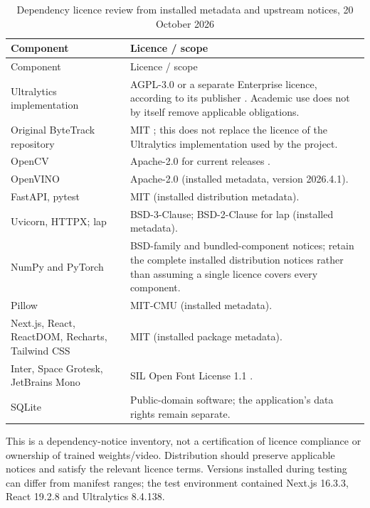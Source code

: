 \begin{longtable}{P{0.32\textwidth}P{0.55\textwidth}}
\caption{Dependency licence review from installed metadata and upstream notices, 20 October 2026}\\
\toprule
Component & Licence / scope\\
\midrule
\endfirsthead
\toprule
Component & Licence / scope\\
\midrule
\endhead
Ultralytics implementation & AGPL-3.0 or a separate Enterprise licence, according to its publisher \cite{ultralyticsLicense}. Academic use does not by itself remove applicable obligations.\\
Original ByteTrack repository & MIT \cite{bytetrackLicense}; this does not replace the licence of the Ultralytics implementation used by the project.\\
OpenCV & Apache-2.0 for current releases \cite{opencvLicense}.\\
OpenVINO & Apache-2.0 (installed metadata, version 2026.4.1).\\
FastAPI, pytest & MIT (installed distribution metadata).\\
Uvicorn, HTTPX; lap & BSD-3-Clause; BSD-2-Clause for lap (installed metadata).\\
NumPy and PyTorch & BSD-family and bundled-component notices; retain the complete installed distribution notices rather than assuming a single licence covers every component.\\
Pillow & MIT-CMU (installed metadata).\\
Next.js, React, ReactDOM, Recharts, Tailwind CSS & MIT (installed package metadata).\\
Inter, Space Grotesk, JetBrains Mono & SIL Open Font License 1.1 \cite{interLicense,spaceGroteskLicense,jetbrainsMonoLicense}.\\
SQLite & Public-domain software; the application's data rights remain separate.\\
\bottomrule
\end{longtable}
This is a dependency-notice inventory, not a certification of licence compliance or ownership of trained weights/video. Distribution should preserve applicable notices and satisfy the relevant licence terms. Versions installed during testing can differ from manifest ranges; the test environment contained Next.js 16.3.3, React 19.2.8 and Ultralytics 8.4.138.

